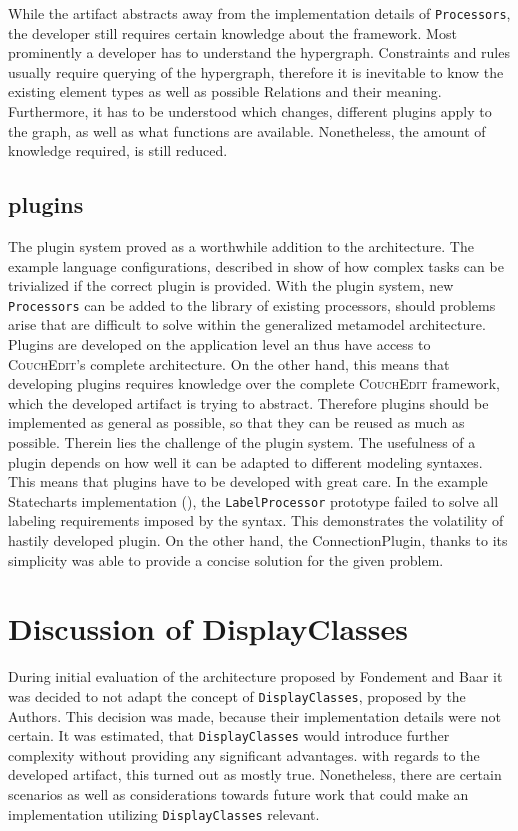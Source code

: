 While the artifact abstracts away from the implementation details of \texttt{Processors}, the developer still requires certain knowledge about the framework. Most prominently a developer has to understand the hypergraph. Constraints and rules usually require querying of the hypergraph, therefore it is inevitable to know the existing element types as well as possible Relations and their meaning. Furthermore, it has to be understood which changes, different plugins apply to the graph, as well as what functions are available. Nonetheless, the amount of knowledge required, is still reduced.

\subsection{plugins}
The plugin system proved as a worthwhile addition to the architecture. The example language configurations, described in  show of how complex tasks can be trivialized if the correct plugin is provided. With the plugin system, new \texttt{Processors} can be added to the library of existing processors, should problems arise that are difficult to solve within the generalized metamodel architecture. Plugins are developed on the application level an thus have access to \textsc{CouchEdit}'s complete architecture. On the other hand, this means that developing plugins requires knowledge over the complete \textsc{CouchEdit} framework, which the developed artifact is trying to abstract. Therefore plugins should be implemented as general as possible, so that they can be reused as much as possible. Therein lies the challenge of the plugin system. The usefulness of a plugin depends on how well it can be adapted to different modeling syntaxes. This means that plugins have to be developed with great care. In the example Statecharts implementation (), the \texttt{LabelProcessor} prototype failed to solve all labeling requirements imposed by the syntax. This demonstrates the volatility of hastily developed plugin. On the other hand, the ConnectionPlugin, thanks to its simplicity was able to provide a concise solution for the given problem.

\section{Discussion of DisplayClasses}
\label{sec:dc-disc}
During initial evaluation of the architecture proposed by Fondement and Baar \cite{fondement_making_2005} it was decided to not adapt the concept of \texttt{DisplayClasses}, proposed by the Authors. This decision was made, because their implementation details were not certain. It was estimated, that \texttt{DisplayClasses} would introduce further complexity without providing any significant advantages. with regards to the developed artifact, this turned out as mostly true. Nonetheless, there are certain scenarios as well as considerations towards future work that could make an implementation utilizing \texttt{DisplayClasses} relevant.

